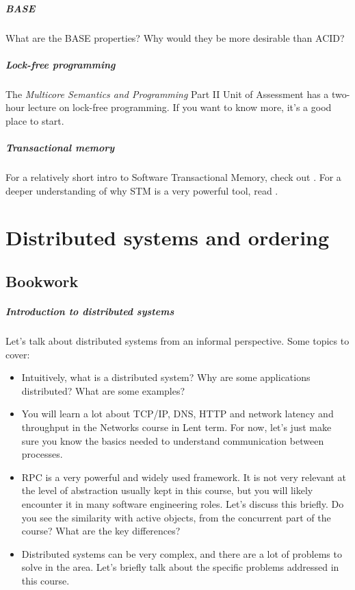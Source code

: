 \documentclass[12pt,a4paper,oneside,openright]{report}
\newcommand{\question}[2]{\paragraph{#1} #2}
\begin{document}
\question{BASE}{What are the BASE properties? Why would they be more
  desirable than ACID?}

\question{Lock-free programming}{The \emph{Multicore Semantics and
    Programming} Part II Unit of Assessment has a two-hour lecture on
  lock-free programming. If you want to know more, it's a good place
  to start.}

\question{Transactional memory}{For a relatively short intro to
  Software Transactional Memory, check out
  \cite[Chapter~18]{ArtMultiprocessorProgramming}. For a deeper
  understanding of why STM is a very powerful tool, read \cite{CMT}.}


\chapter{Distributed systems and ordering}

\section{Bookwork}

\question{Introduction to distributed systems}{Let's talk about
  distributed systems from an informal perspective. Some topics to
  cover:
  \begin{itemize}
  \item Intuitively, what is a distributed system? Why are some
    applications distributed? What are some examples?
  \item You will learn a lot about TCP/IP, DNS, HTTP and network
    latency and throughput in the Networks course in Lent term. For
    now, let's just make sure you know the basics needed to understand
    communication between processes.
  \item RPC is a very powerful and widely used framework. It is not
    very relevant at the level of abstraction usually kept in this
    course, but you will likely encounter it in many software
    engineering roles. Let's discuss this briefly. Do you see the
    similarity with active objects, from the concurrent part of the
    course? What are the key differences?
  \item Distributed systems can be very complex, and there are a lot
    of problems to solve in the area. Let's briefly talk about the
    specific problems addressed in this course.
  \end{itemize}
}
\end{document}
